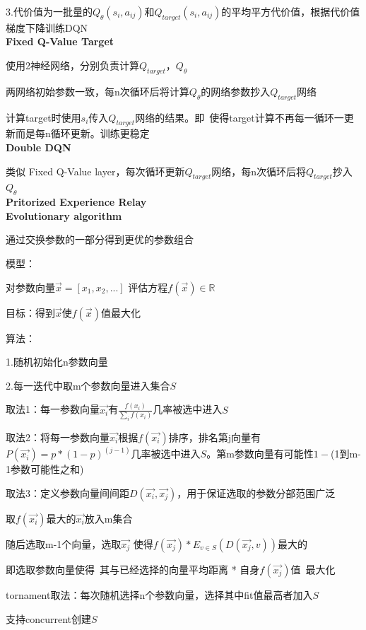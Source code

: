 \documentclass[UTF8]{ctexart}
\begin{document}
  \quad 3.代价值为一批量的$Q_{\theta}(s_i, a_{ij})$和$Q_{target}(s_i, a_{ij})$的平均平方代价值，根据代价值梯度下降训练DQN\\
\textbf{Fixed Q-Value Target}

  使用2神经网络，分别负责计算$Q_{target}$，$Q_{\theta}$

  两网络初始参数一致，每n次循环后将计算$Q_{\theta}$的网络参数抄入$Q_{target}$网络

  计算target时使用$s_i$传入$Q_{target}$网络的结果。即\ 使得target计算不再每一循环一更新而是每n循环更新。训练更稳定\\
\textbf{Double DQN} 

  类似 Fixed Q-Value layer，每次循环更新$Q_{target}$网络，每n次循环后将$Q_{target}$抄入$Q_{\theta}$\\
\textbf{Pritorized Experience Relay}\\
\textbf{Evolutionary algorithm}

  通过交换参数的一部分得到更优的参数组合

  模型：

  \quad 对参数向量$\vec{x} = [x_1, x_2, ...]$ 评估方程$f(\vec{x}) \in \mathbb{R} $

  目标：得到$\vec{x}$使$f(\vec{x})$值最大化

  算法：

  \quad 1.随机初始化n参数向量

  \quad 2.每一迭代中取m个参数向量进入集合$S$

  \quad \quad 取法1：每一参数向量$\vec{x_i}$有$\frac{f(x_i)}{\sum_i f(x_i)}$几率被选中进入$S$

  \quad \quad 取法2：将每一参数向量$\vec{x_i}$根据$f(\vec{x_i})$排序，排名第j向量有$P(\vec{x_i}) = p * (1-p)^(j-1)$几率被选中进入$S$。第m参数向量有可能性$1-$(1到m-1参数可能性之和)

  \quad \quad 取法3：定义参数向量间间距$D(\vec{x_i}, \vec{x_j})$，用于保证选取的参数分部范围广泛

  \quad \quad \quad 取$f(\vec{x_i})$最大的$\vec{x_i}$放入m集合

  \quad \quad \quad 随后选取m-1个向量，选取$\vec{x_j}$ 使得$f(\vec{x_j}) * E_{v \in S}(D(\vec{x_j}, v))$最大的

  \quad \quad \quad 即选取参数向量使得\ 其与已经选择的向量平均距离 * 自身$f(\vec{x_j})$值\ 最大化

  \quad \quad tornament取法：每次随机选择n个参数向量，选择其中fit值最高者加入$S$

  \quad \quad \quad 支持concurrent创建$S$
\end{document}
